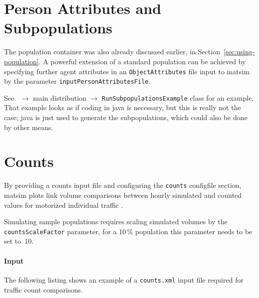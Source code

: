 
\section{Person Attributes and Subpopulations}
\label{sec:extending-population}

The population container was also already discussed earlier, in Section~\ref{sec:using-population}.
%
A powerful extension of a standard population can be achieved by specifying further agent attributes in an \lstinline|ObjectAttributes| file input to \gls{matsim} by the parameter \lstinline|inputPersonAttributesFile|. 
%

See \javadoc\ $\to$ main distribution $\to$ \lstinline{RunSubpopulationsExample} class for an example.  That example looks as if coding in \gls{java} is necessary, but this is really not the case; \gls{java} is just used to generate the subpopulations, which could also  be done by other means.


\section{Counts}
\label{sec:extending-counts}
By providing a counts input file and configuring the \lstinline|counts| \gls{configfile} section, \gls{matsim} plots link volume comparisons between hourly simulated and counted values for motorized individual traffic \citep{Horni_unpub_IVT_2007}. 

Simulating sample populations requires scaling simulated volumes by the \lstinline|countsScaleFactor| parameter, \eg for a 10\,\% population this parameter needs to be set to~10.

\paragraph{Input}
The following listing shows an example of a \lstinline|counts.xml| input file required for traffic count comparisons. 

